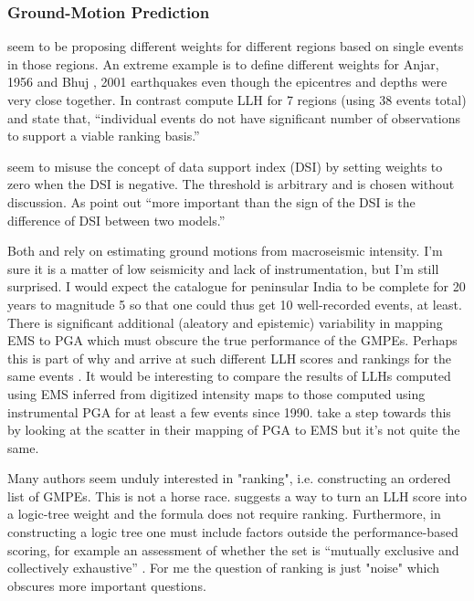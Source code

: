 \documentclass{article}
\begin{document}
\subsubsection{Ground-Motion Prediction}
\label{subsubsec:GmpeWeights}

\cite{anbazhagan2015selection} seem to be proposing different weights for different regions based on single events in those regions. An extreme example is to define different weights for Anjar, 1956 and Bhuj , 2001 earthquakes even though the epicentres and depths were very close together. In contrast \cite{nath2011peak} compute LLH for 7 regions (using 38 events total) and state that, ``individual events do not have significant number of observations to support a viable ranking basis.''

\cite{anbazhagan2015selection} seem to misuse the concept of data support index (DSI) \citep{delavaud2012toward} by setting weights to zero when the DSI is negative. The threshold is arbitrary and is chosen without discussion. As \cite{delavaud2012toward} point out ``more important
than the sign of the DSI is the difference of DSI between
two models.''

Both \cite{anbazhagan2015selection} and \cite{nath2011peak} rely on estimating ground motions from macroseismic intensity. I'm sure it is a matter of low seismicity and lack of instrumentation, but I'm still surprised. I would expect the catalogue for peninsular India to be complete for 20 years to magnitude 5 so that one could thus get 10 well-recorded events, at least. There is significant additional (aleatory and epistemic) variability in mapping EMS to PGA which must obscure the true performance of the GMPEs.  Perhaps this is part of why  \cite{anbazhagan2015selection} and \cite{nath2011peak} arrive at such different LLH scores and rankings for the same events \cite[][Table 5]{anbazhagan2015selection}. It would be interesting to compare the results of LLHs computed using EMS inferred from digitized intensity maps to those computed using instrumental PGA for at least a few events since 1990. \cite{nath2011peak} take a step towards this by looking at the scatter in their mapping of PGA to EMS but it's not quite the same.

Many authors \citep{scherbaum2009model, nath2011peak, delavaud2012toward, anbazhagan2015selection} seem unduly interested in "ranking", i.e.  constructing an ordered list of GMPEs. This is not a horse race. \cite{scherbaum2009model} suggests a way to turn an LLH score into a logic-tree weight and the formula does not require ranking. Furthermore, in constructing a logic tree one must include factors outside the performance-based scoring, for example an assessment of whether the set is ``mutually exclusive and collectively exhaustive'' \citep{bommer2008use}. For me the question of ranking is just "noise" which obscures more important questions.
\end{document}

